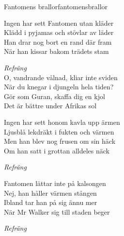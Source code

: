 \begin{song}{Fantomens brallor}{fantomensbrallor}
\begin{vers}
Ingen har sett Fantomen utan kläder\\
Klädd i pyjamas och stövlar av läder\\
Han drar nog bort en rand där fram\\
När han kissar bakom trädets stam\\
\end{vers}
\begin{vers}
\textit{Refräng}\\
O, vandrande vålnad, kliar inte sviden\\
När du knegar i djungeln hela tiden?\\
Gör som Guran, skaffa dig en kjol\\
Det är bättre under Afrikas sol\\
\end{vers}
\begin{vers}
Ingen har sett honom kavla upp ärmen\\
Ljusblå lekdräkt i fukten och värmen\\
Men han blev nog frusen om sin häck\\
Om han satt i grottan alldeles näck\\
\end{vers}
\begin{vers}
\textit{Refräng}\\
\end{vers}
\begin{vers}
Fantomen lättar inte på kalsongen\\
Nej, han håller värmen stången\\
Ibland tar han på sig ännu mer\\
När Mr Walker sig till staden beger\\
\end{vers}
\begin{vers}
\textit{Refräng}\\
\end{vers}
\end{song}
